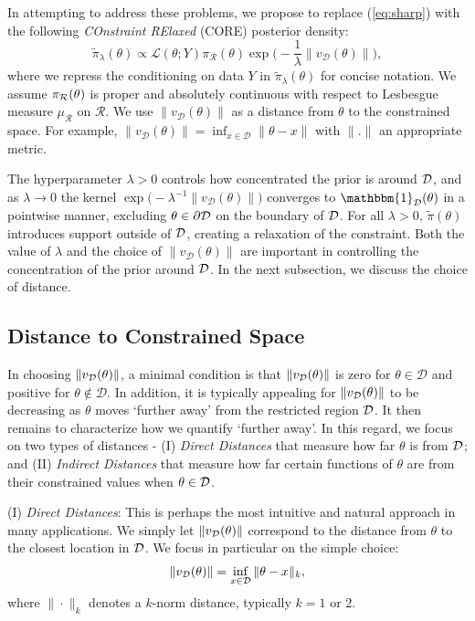\documentclass[10pt,fleqn]{article}
\DeclareMathOperator{\1}{\mathbbm{1}} \DeclareMathOperator{\bigO}{\mc O}
\begin{document}
In attempting to address these problems, we propose to replace (\ref{eq:sharp}) with the following {\em COnstraint RElaxed} (CORE) posterior density: 
\begin{equation}
\label{EQ:Rel_Dens_Motivation}
\tilde{\pi}_{\lambda}(\theta) \propto
\mathcal{L}(\theta; Y)  \pi_\mathcal{R}(\theta)
\exp\bigg(-\frac{1}{\lambda} \|v_\mathcal{D}(\theta)\|\bigg),
\end{equation}
where we repress the conditioning on data $Y$ in $\tilde{\pi}_{\lambda}(\theta)$ for concise notation. 
We assume $\pi_{\mathcal{R}}(\theta)$ is proper  and absolutely continuous with respect to Lesbesgue measure $\mu_\mathcal{R}$ on $\mathcal{R}$. We use $\|v_\mathcal{D}(\theta)\|$ as
a distance from $\theta$ to the constrained space.  For example, $\|v_\mathcal{D}(\theta)\| = \inf_{x\in\mathcal{D}} \|\theta-x\|$ with $\|.\|$ an appropriate metric.

The hyperparameter $\lambda > 0$ controls how concentrated the prior is around 
${\mathcal{D}}$, and as $\lambda \to 0$ the kernel $\exp\big(- \lambda^{-1}\|v_\mathcal{D}(\theta)\|)$
converges to $\mathbbm{1}_\mathcal{D}(\theta)$ in a pointwise manner, excluding $\theta \in \partial {\mathcal{D}}$ on the boundary of ${\mathcal{D}}$.  For all $\lambda > 0$, $\tilde{\pi}(\theta)$ introduces support outside
of $\mathcal{D}$, creating a relaxation of the constraint.  Both the value of $\lambda$ and the choice of $\|v_\mathcal{D}(\theta)\|$ are important in controlling the concentration of the prior around $\mathcal{D}$.
In the next subsection, we discuss the choice of distance.

 \subsection{Distance to Constrained Space}

In choosing $\|v_{\mathcal{D}}(\theta)\|$, a minimal condition is that $\|v_{\mathcal{D}}(\theta)\|$ is zero for $\theta \in \mathcal{D}$ and positive for $\theta\not\in\mathcal{D}$. In addition, it is typically appealing for $\|v_{\mathcal{D}}(\theta)\|$ to be decreasing as $\theta$ moves `further away' from the restricted region $\mathcal{D}$.
It then remains to characterize how we quantify `further away'.  In this regard, we focus on two types of distances - (I) {\em Direct Distances} that measure how far $\theta$ is from $\mathcal{D}$; and (II) {\em Indirect Distances} that measure how far certain functions of $\theta$ are from their constrained values when $\theta \in \mathcal{D}$.

(I) {\em Direct Distances}: This is perhaps the most intuitive and natural approach in many applications.  We simply let $\|v_{\mathcal{D}}(\theta)\|$ correspond to the distance from $\theta$ to the closest location in $\mathcal{D}$.  We focus in particular on the simple choice: 
\begin{eqnarray}
\|v_{\mathcal{D}}(\theta)\| = \inf_{x\in\mathcal{D}} \|\theta-x\|_k,
\label{eq:DD}
\end{eqnarray}
where $\|\cdot\|_k$ denotes a $k$-norm distance, typically $k=1$ or $2$.
\end{document}
